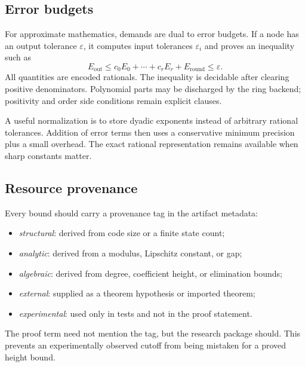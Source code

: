 \subsection{Error budgets}

For approximate mathematics, demands are dual to error budgets.  If a node has
an output tolerance \(\varepsilon\), it computes input tolerances
\(\varepsilon_i\) and proves an inequality such as
\[
    E_{\mathrm{out}}
       \le c_0E_0+\cdots+c_rE_r+E_{\mathrm{round}}
       \le\varepsilon.
\]
All quantities are encoded rationals.  The inequality is decidable after
clearing positive denominators.  Polynomial parts may be discharged by the
ring backend; positivity and order side conditions remain explicit clauses.

A useful normalization is to store dyadic exponents instead of arbitrary
rational tolerances.  Addition of error terms then uses a conservative minimum
precision plus a small overhead.  The exact rational representation remains
available when sharp constants matter.

\subsection{Resource provenance}

Every bound should carry a provenance tag in the artifact metadata:

\begin{itemize}
\item \emph{structural}: derived from code size or a finite state count;
\item \emph{analytic}: derived from a modulus, Lipschitz constant, or gap;
\item \emph{algebraic}: derived from degree, coefficient height, or elimination
bounds;
\item \emph{external}: supplied as a theorem hypothesis or imported theorem;
\item \emph{experimental}: used only in tests and not in the proof statement.
\end{itemize}

The proof term need not mention the tag, but the research package should.  This
prevents an experimentally observed cutoff from being mistaken for a proved
height bound.
